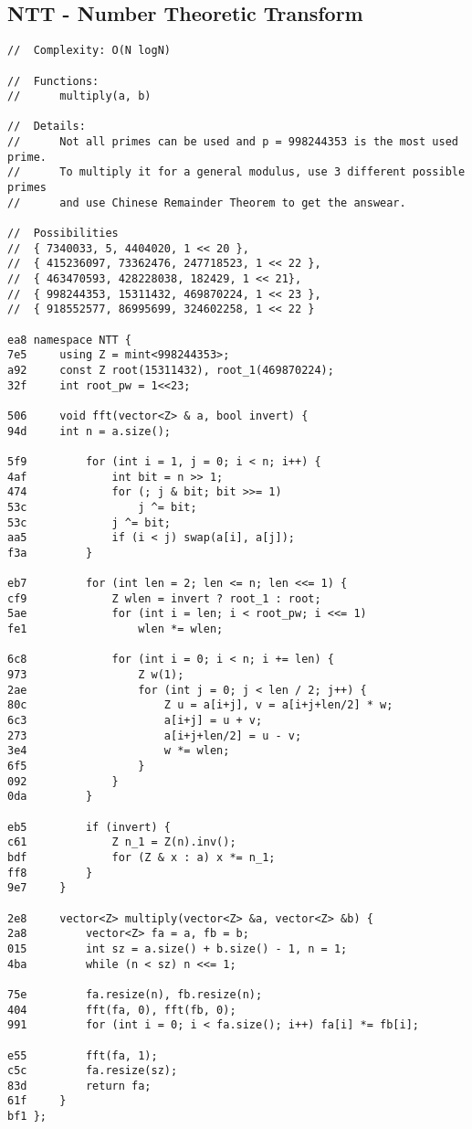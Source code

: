 \documentclass[11pt, a4paper, twoside]{article}
\begin{document}
\subsection{ NTT - Number Theoretic Transform}
\begin{lstlisting}
//  Complexity: O(N logN)

//  Functions:
//      multiply(a, b)

//  Details:
//      Not all primes can be used and p = 998244353 is the most used prime. 
//      To multiply it for a general modulus, use 3 different possible primes 
//      and use Chinese Remainder Theorem to get the answear.

//  Possibilities
//  { 7340033, 5, 4404020, 1 << 20 },
//  { 415236097, 73362476, 247718523, 1 << 22 },
//  { 463470593, 428228038, 182429, 1 << 21},
//  { 998244353, 15311432, 469870224, 1 << 23 },
//  { 918552577, 86995699, 324602258, 1 << 22 }

ea8 namespace NTT {
7e5     using Z = mint<998244353>;
a92     const Z root(15311432), root_1(469870224);
32f     int root_pw = 1<<23;
    
506     void fft(vector<Z> & a, bool invert) {
94d 	int n = a.size();
    
5f9         for (int i = 1, j = 0; i < n; i++) {
4af             int bit = n >> 1;
474             for (; j & bit; bit >>= 1)
53c                 j ^= bit;
53c             j ^= bit;
aa5             if (i < j) swap(a[i], a[j]);
f3a         }
    
eb7         for (int len = 2; len <= n; len <<= 1) {
cf9             Z wlen = invert ? root_1 : root;
5ae             for (int i = len; i < root_pw; i <<= 1)
fe1                 wlen *= wlen;
    
6c8             for (int i = 0; i < n; i += len) {
973                 Z w(1);
2ae                 for (int j = 0; j < len / 2; j++) {
80c                     Z u = a[i+j], v = a[i+j+len/2] * w;
6c3                     a[i+j] = u + v;
273                     a[i+j+len/2] = u - v;
3e4                     w *= wlen;
6f5                 }
092             }
0da         }
    
eb5         if (invert) {
c61             Z n_1 = Z(n).inv();
bdf             for (Z & x : a) x *= n_1;
ff8         }
9e7     }
     
2e8     vector<Z> multiply(vector<Z> &a, vector<Z> &b) {
2a8         vector<Z> fa = a, fb = b;
015         int sz = a.size() + b.size() - 1, n = 1;
4ba         while (n < sz) n <<= 1;
    
75e         fa.resize(n), fb.resize(n);
404         fft(fa, 0), fft(fb, 0);
991         for (int i = 0; i < fa.size(); i++) fa[i] *= fb[i];
    
e55         fft(fa, 1);
c5c         fa.resize(sz);
83d         return fa;
61f     }
bf1 };
\end{lstlisting}
\end{document}
